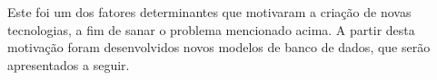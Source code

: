 

\par Este foi um dos fatores determinantes que motivaram a criação de novas tecnologias, a fim de sanar o problema mencionado acima. A partir desta motivação foram desenvolvidos novos modelos de banco de dados, que serão apresentados a seguir.
